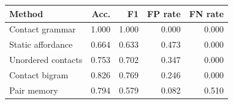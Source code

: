 \begin{tabular}{lrrrr}
\toprule
Method & Acc. & F1 & FP rate & FN rate \\
\midrule
Contact grammar & 1.000 & 1.000 & 0.000 & 0.000 \\
Static affordance & 0.664 & 0.633 & 0.473 & 0.000 \\
Unordered contacts & 0.753 & 0.702 & 0.347 & 0.000 \\
Contact bigram & 0.826 & 0.769 & 0.246 & 0.000 \\
Pair memory & 0.794 & 0.579 & 0.082 & 0.510 \\
\bottomrule
\end{tabular}
